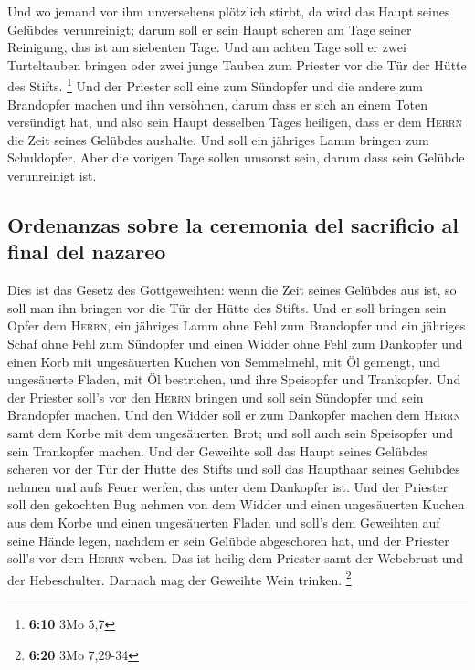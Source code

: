  Und wo jemand vor ihm unversehens plötzlich stirbt, da
wird das Haupt seines Gelübdes verunreinigt; darum soll er sein Haupt
scheren am Tage seiner Reinigung, das ist am siebenten Tage.
 Und am achten Tage soll er zwei Turteltauben bringen
oder zwei junge Tauben zum Priester vor die Tür der Hütte des Stifts.
\footnote{\textbf{6:10} 3Mo 5,7}  Und der Priester soll
eine zum Sündopfer und die andere zum Brandopfer machen und ihn
versöhnen, darum dass er sich an einem Toten versündigt hat, und also
sein Haupt desselben Tages heiligen,  dass er dem
\textsc{Herrn} die Zeit seines Gelübdes aushalte. Und soll ein jähriges
Lamm bringen zum Schuldopfer. Aber die vorigen Tage sollen umsonst sein,
darum dass sein Gelübde verunreinigt ist.

\hypertarget{ordenanzas-sobre-la-ceremonia-del-sacrificio-al-final-del-nazareo}{%
\subsection{Ordenanzas sobre la ceremonia del sacrificio al final del
nazareo}\label{ordenanzas-sobre-la-ceremonia-del-sacrificio-al-final-del-nazareo}}

 Dies ist das Gesetz des Gottgeweihten: wenn die Zeit
seines Gelübdes aus ist, so soll man ihn bringen vor die Tür der Hütte
des Stifts.  Und er soll bringen sein Opfer dem
\textsc{Herrn}, ein jähriges Lamm ohne Fehl zum Brandopfer und ein
jähriges Schaf ohne Fehl zum Sündopfer und einen Widder ohne Fehl zum
Dankopfer  und einen Korb mit ungesäuerten Kuchen von
Semmelmehl, mit Öl gemengt, und ungesäuerte Fladen, mit Öl bestrichen,
und ihre Speisopfer und Trankopfer.  Und der Priester
soll's vor den \textsc{Herrn} bringen und soll sein Sündopfer und sein
Brandopfer machen.  Und den Widder soll er zum Dankopfer
machen dem \textsc{Herrn} samt dem Korbe mit dem ungesäuerten Brot; und
soll auch sein Speisopfer und sein Trankopfer machen. 
Und der Geweihte soll das Haupt seines Gelübdes scheren vor der Tür der
Hütte des Stifts und soll das Haupthaar seines Gelübdes nehmen und aufs
Feuer werfen, das unter dem Dankopfer ist.  Und der
Priester soll den gekochten Bug nehmen von dem Widder und einen
ungesäuerten Kuchen aus dem Korbe und einen ungesäuerten Fladen und
soll's dem Geweihten auf seine Hände legen, nachdem er sein Gelübde
abgeschoren hat,  und der Priester soll's vor dem
\textsc{Herrn} weben. Das ist heilig dem Priester samt der Webebrust und
der Hebeschulter. Darnach mag der Geweihte Wein trinken. \footnote{\textbf{6:20}
  3Mo 7,29-34}

